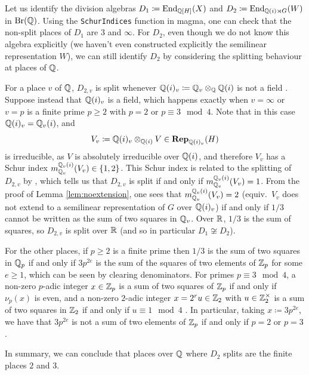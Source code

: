 \begin{remark}\label{rem:differentdivalg}
    Let us identify the division algebras $D_1 \coloneqq \operatorname{End}_{{\mathbb Q}[H]}(X)$ and $D_2 \coloneqq \operatorname{End}_{{\mathbb Q}(i) \rtimes G}(W)$ in $\operatorname{Br}({\mathbb Q})$. Using the \texttt{SchurIndices} function in magma, one can check that the non-split places of $D_1$ are $3$ and $\infty$. For $D_2$, even though we do not know this algebra explicitly (we haven't even constructed explicitly the semilinear representation $W$), we can still identify $D_2$ by considering the splitting behaviour at places of ${\mathbb Q}$.
    
    For a place $v$ of ${\mathbb Q}$, $D_{2,v}$ is split whenever ${\mathbb Q}(i)_v \coloneqq {\mathbb Q}_v \otimes_{{\mathbb Q}} {\mathbb Q}(i)$ is not a field \cite[Cor.\ 11.4]{TAYSchur}. Suppose instead that ${\mathbb Q}(i)_v$ is a field, which happens exactly when $v = \infty$ or $v = p$ is a finite prime $p \geq 2$ with $p = 2$ or $p \equiv 3 \!\! \mod 4$. Note that in this case ${\mathbb Q}(i)_v = {\mathbb Q}_v(i)$, and
    \[
    V_v \coloneqq {\mathbb Q}(i)_v \otimes_{{\mathbb Q}(i)} V \in \operatorname{\mathbf{Rep}}_{{\mathbb Q}(i)_v}(H)
    \]
    is irreducible, as $V$ is absolutely irreducible over ${\mathbb Q}(i)$, and therefore $V_v$ has a Schur index $m_{{\mathbb Q}_v}^{{\mathbb Q}_v(i)}(V_v) \in \{1,2\}$. This Schur index is related to the splitting of $D_{2,v}$ by \cite[Cor.\ 11.4]{TAYSchur}, which tells us that $D_{2,v}$ is split if and only if $m_{{\mathbb Q}_v}^{{\mathbb Q}_v(i)}(V_v) = 1$. From the proof of Lemma \ref{lem:noextension}, one sees that $m_{{\mathbb Q}_v}^{{\mathbb Q}_v(i)}(V_v) = 2$ (equiv.\ $V_v$ does not extend to a semilinear representation of $G$ over ${\mathbb Q}(i)_v$) if and only if $1/3$ cannot be written as the sum of two squares in ${\mathbb Q}_v$. Over ${\mathbb R}$, $1/3$ is the sum of squares, so $D_{2,v}$ is split over ${\mathbb R}$ (and so in particular $D_1 \not\cong D_2$). 

    For the other places, if $p \geq 2$ is a finite prime then $1/3$ is the sum of two squares in ${\mathbb Q}_p$ if and only if $3p^{2e}$ is the sum of the squares of two elements of ${\mathbb Z}_p$ for some $e \geq 1$, which can be seen by clearing denominators. For primes $p \equiv 3 \!\! \mod 4$, a non-zero $p$-adic integer $x \in {\mathbb Z}_p$ is a sum of two squares of ${\mathbb Z}_p$ if and only if $\nu_p(x)$ is even, and a non-zero $2$-adic integer $x = 2^r u \in {\mathbb Z}_2$ with $u \in {\mathbb Z}_2^{\times}$ is a sum of two squares in ${\mathbb Z}_2$ if and only if $u \equiv 1 \!\! \mod 4$ \cite{KCON}. In particular, taking $x \coloneqq 3p^{2e}$, we have that $3p^{2e}$ is not a sum of two elements of ${\mathbb Z}_p$ if and only if $p = 2$ or $p = 3$.

    In summary, we can conclude that places over ${\mathbb Q}$ where $D_2$ splits are the finite places $2$ and $3$. 
\end{remark}

